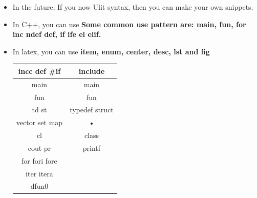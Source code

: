 \documentclass[paper=8.5in:11in, twoside, 12pt, pagesize=pdftex]{book}
\begin{document}
\begin{itemize}
										\item In the future, If you now Ulit syntax, then you can make your own snippets. 
										
										\item In C++, you can use \textbf{Some common use pattern are: 	main, fun, for inc ndef def, if ife el elif.} 
										\item In latex, you can use \textbf{item, enum, center, desc, lst and fig}
										
										\begin{tabular}{|c|c|}
											\hline 
											incc def \#if & include \\ 
											\hline 
											main & main \\ 
											\hline 
											fun & fun \\ 
											\hline 
											td st & typedef struct \\ 
											\hline 
											vector set map & • \\ 
											\hline 
											cl & class \\ 
											\hline 
											cout pr & printf \\ 
											\hline 
											for fori fore &  \\ 
											\hline 
											iter itera &  \\ 
											\hline 
											dfun0  &  \\ 
											
											\hline 
										\end{tabular} 
									\end{itemize}
									
									
\end{document}
